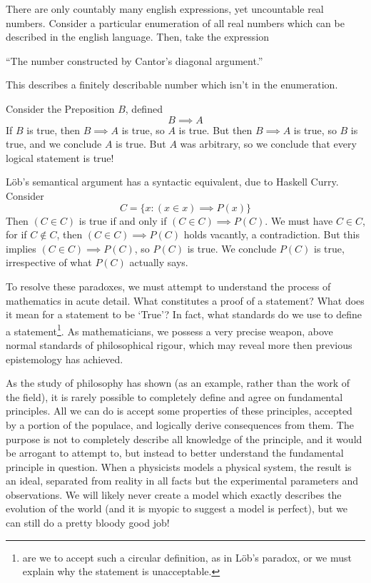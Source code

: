 \begin{example}[Richard]
    There are only countably many english expressions, yet uncountable real numbers. Consider a particular enumeration of all real numbers which can be described in the english language. Then, take the expression
    \begin{displayquote}
        ``The number constructed by Cantor's diagonal argument.''
    \end{displayquote}
    This describes a finitely describable number which isn't in the enumeration.
\end{example}

\begin{example}[L\"{o}b]
    Consider the Preposition $B$, defined
    \[ B \implies A \]
    If $B$ is true, then $B \implies A$ is true, so $A$ is true. But then $B \implies A$ is true, so $B$ is true, and we conclude $A$ is true. But $A$ was arbitrary, so we conclude that every logical statement is true!
\end{example}

\begin{example}[Curry]
    L\"{o}b's semantical argument has a syntactic equivalent, due to Haskell Curry. Consider
    \[ C = \{ x : (x \in x) \implies P(x) \} \]
    Then $(C \in C)$ is true if and only if $(C \in C) \implies P(C)$. We must have $C \in C$, for if $C \not \in C$, then $(C \in C) \implies P(C)$ holds vacantly, a contradiction. But this implies $(C \in C) \implies P(C)$, so $P(C)$ is true. We conclude $P(C)$ is true, irrespective of what $P(C)$ actually says.
\end{example}

To resolve these paradoxes, we must attempt to understand the process of mathematics in acute detail. What constitutes a proof of a statement? What does it mean for a statement to be `True'? In fact, what standards do we use to define a statement\footnote{are we to accept such a circular definition, as in L\"{o}b's paradox, or we must explain why the statement is unacceptable.}. As mathematicians, we possess a very precise weapon, above normal standards of philosophical rigour, which may reveal more then previous epistemology has achieved.

As the study of philosophy has shown (as an example, rather than the work of the field), it is rarely possible to completely define and agree on fundamental principles. All we can do is accept some properties of these principles, accepted by a portion of the populace, and logically derive consequences from them. The purpose is not to completely describe all knowledge of the principle, and it would be arrogant to attempt to, but instead to better understand the fundamental principle in question. When a physicists models a physical system, the result is an ideal, separated from reality in all facts but the experimental parameters and observations. We will likely never create a model which exactly describes the evolution of the world (and it is myopic to suggest a model is perfect), but we can still do a pretty bloody good job!

